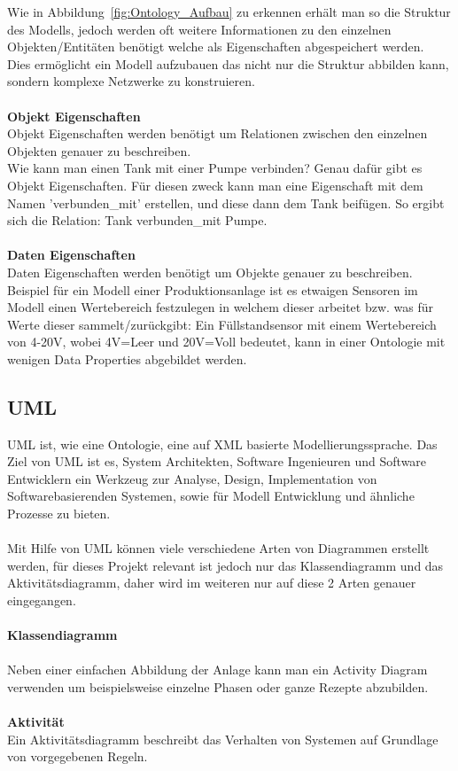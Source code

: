 Wie in Abbildung~\ref{fig:Ontology_Aufbau} zu erkennen erhält man so die Struktur des Modells, jedoch werden oft weitere Informationen zu den einzelnen Objekten/Entitäten benötigt welche als Eigenschaften abgespeichert werden.\\
Dies ermöglicht ein Modell aufzubauen das nicht nur die Struktur abbilden kann, sondern komplexe Netzwerke zu konstruieren.\\
\\
\noindent \textbf{Objekt Eigenschaften}\\
Objekt Eigenschaften werden benötigt um Relationen zwischen den einzelnen Objekten genauer zu beschreiben.\\ 
Wie kann man einen Tank mit einer Pumpe verbinden? Genau dafür gibt es Objekt Eigenschaften. Für diesen zweck kann man eine Eigenschaft mit dem Namen 'verbunden\_mit' erstellen, und diese dann dem Tank beifügen. So ergibt sich die Relation: Tank verbunden\_mit Pumpe.\\
\\
\textbf{Daten Eigenschaften}\\
Daten Eigenschaften werden benötigt um Objekte genauer zu beschreiben. 
\\
Beispiel für ein Modell einer Produktionsanlage ist es etwaigen Sensoren im Modell einen Wertebereich festzulegen in welchem dieser arbeitet bzw. was für Werte dieser sammelt/zurückgibt: Ein Füllstandsensor mit einem Wertebereich von 4-20V, wobei 4V=Leer und 20V=Voll bedeutet, kann in einer Ontologie mit wenigen Data Properties abgebildet werden.

\subsection{UML}
UML ist, wie eine Ontologie, eine auf XML basierte Modellierungssprache.
Das Ziel von UML ist es, System Architekten, Software Ingenieuren und Software Entwicklern ein Werkzeug zur Analyse, Design, Implementation von Softwarebasierenden Systemen, sowie für Modell Entwicklung und ähnliche Prozesse zu bieten.\\
\\
Mit Hilfe von UML können viele verschiedene Arten von Diagrammen erstellt werden, für dieses Projekt relevant ist jedoch nur das Klassendiagramm und das Aktivitätsdiagramm, daher wird im weiteren nur auf diese 2 Arten genauer eingegangen.\\
\\
\textbf{Klassendiagramm}\\
\\
Neben einer einfachen Abbildung der Anlage kann man ein Activity Diagram verwenden um beispielsweise einzelne Phasen oder ganze Rezepte abzubilden.\\
\\
\textbf{Aktivität}\\
Ein Aktivitätsdiagramm beschreibt das Verhalten von Systemen auf Grundlage von vorgegebenen Regeln. 

